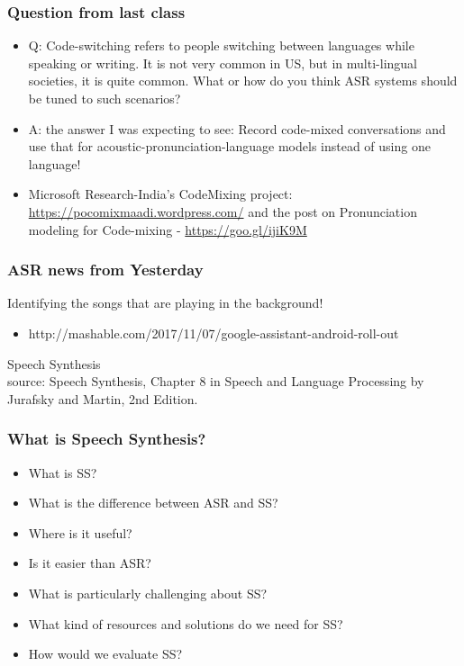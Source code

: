 \documentclass{beamer}
\begin{document}
\begin{frame}
\frametitle{Question from last class}
\begin{itemize}
\item Q: Code-switching refers to people switching between languages while speaking or writing. It is not very common in US, but in multi-lingual societies, it is quite common. What or how do you think ASR systems should be tuned to such scenarios? 
\pause \item A: the answer I was expecting to see: Record code-mixed conversations and use that for acoustic-pronunciation-language models instead of using one language!
\pause \item Microsoft Research-India's CodeMixing project: \url{https://pocomixmaadi.wordpress.com/} and the post on Pronunciation modeling for Code-mixing - \url{https://goo.gl/ijiK9M}
\end{itemize}
\end{frame}

\begin{frame}
\frametitle{ASR news from Yesterday}
Identifying the songs that are playing in the background!
\begin{itemize}
\item http://mashable.com/2017/11/07/google-assistant-android-roll-out
\end{itemize}
\end{frame}

\begin{frame}
\begin{center}
\Large Speech Synthesis
\\ \tiny source: Speech Synthesis, Chapter 8 in Speech and Language Processing by Jurafsky and Martin, 2nd Edition.
\end{center}
\end{frame}

\begin{frame}
\frametitle{What is Speech Synthesis?}
\begin{itemize}
\item What is SS? \pause
\item What is the difference between ASR and SS?\pause
\item Where is it useful? \pause
\item Is it easier than ASR?  \pause
\item What is particularly challenging about SS? \pause
\item What kind of resources and solutions do we need for SS? \pause
\item How would we evaluate SS? 
\end{itemize}
\end{frame}
\end{document}
